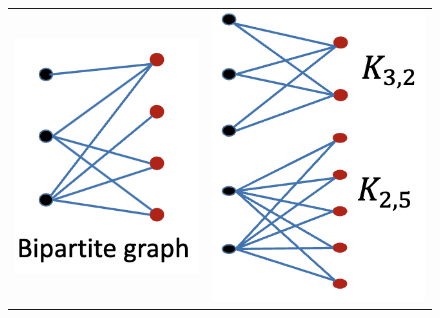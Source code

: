 \documentclass{article}
\begin{document}
\begin{description}
    \begin{figure}[H]
		\centering
		\begin{tabular}{ll}
			\includegraphics[scale=0.5]{bpt_graph} & \includegraphics[scale=0.5]{complete_bpt_graph} \\
		\end{tabular}
	\end{figure}
    

\end{description}
\end{document}
